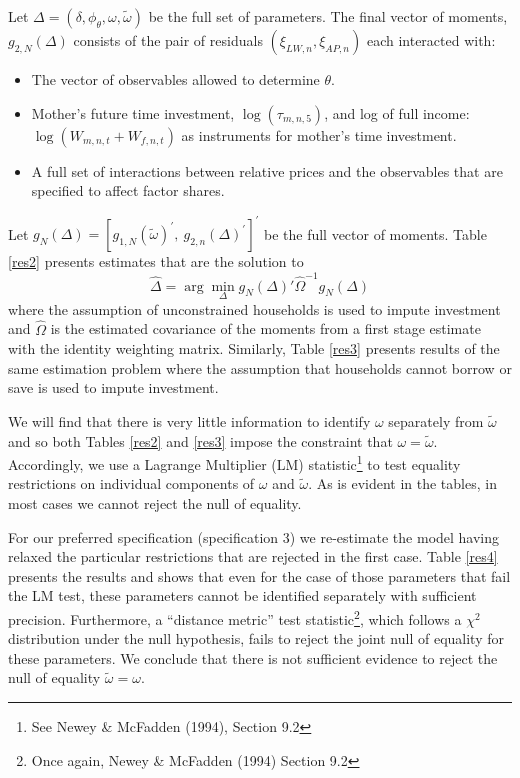 \documentclass{article}
\begin{document}
Let $\Delta=(\delta,\phi_{\theta},\omega,\tilde{\omega})$ be the full set of parameters. The final vector of moments, $g_{2,N}(\Delta)$ consists of the pair of residuals $(\xi_{LW,n},\xi_{AP,n})$ each interacted with:
\begin{itemize}
    \item The vector of observables allowed to determine $\theta$.
    \item Mother's future time investment, $\log(\tau_{m,n,5})$, and log of full income: $\log(W_{m,n,t}+W_{f,n,t})$ as instruments for mother's time investment.
    \item A full set of interactions between relative prices and the observables that are specified to affect factor shares.
\end{itemize}

Let $g_{N}(\Delta) = [g_{1,N}(\tilde{\omega})^\prime,\ g_{2,n}(\Delta)^\prime]^\prime$ be the full vector of moments. Table \ref{res2} presents estimates that are the solution to
\[ \hat{\Delta} = \arg\min_{\Delta}g_{N}(\Delta)'\hat{\Omega}^{-1}g_{N}(\Delta) \]
where the assumption of unconstrained households is used to impute investment and $\hat{\Omega}$ is the estimated covariance of the moments from a first stage estimate with the identity weighting matrix. Similarly, Table \ref{res3} presents results of the same estimation problem where the assumption that households cannot borrow or save is used to impute investment.

We will find that there is very little information to identify $\omega$ separately from $\tilde{\omega}$ and so both Tables \ref{res2} and \ref{res3} impose the constraint that $\omega=\tilde{\omega}$. Accordingly, we use a Lagrange Multiplier (LM) statistic\footnote{See Newey \& McFadden (1994), Section 9.2} to test equality restrictions on individual components of $\omega$ and $\tilde{\omega}$. As is evident in the tables, in most cases we cannot reject the null of equality. 

For our preferred specification (specification 3) we re-estimate the model having relaxed the particular restrictions that are rejected in the first case. Table \ref{res4} presents the results and shows that even for the case of those parameters that fail the LM test, these parameters cannot be identified separately with sufficient precision. Furthermore, a ``distance metric'' test statistic\footnote{Once again, Newey \& McFadden (1994) Section 9.2}, which follows a $\chi^2$ distribution under the null hypothesis, fails to reject the joint null of equality for these parameters. We conclude that there is not sufficient evidence to reject the null of equality $\tilde{\omega}=\omega$.
\end{document}
